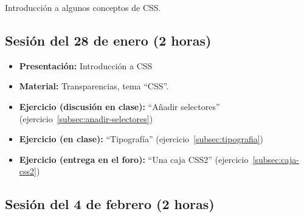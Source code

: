 \documentclass[a4paper,12pt]{report}
\begin{document}
Introducción a algunos conceptos de CSS.

\subsection{Sesión del 28 de enero (2 horas)}

\begin{itemize}
\item \textbf{Presentación:} Introducción a CSS
\item \textbf{Material:} Transparencias, tema ``CSS''.
\item \textbf{Ejercicio (discusión en clase):} ``Añadir selectores'' (ejercicio~\ref{subsec:anadir-selectores})
\item \textbf{Ejercicio (en clase):} ``Tipografía'' (ejercicio~\ref{subsec:tipografia})
\item \textbf{Ejercicio (entrega en el foro):} ``Una caja CSS2'' (ejercicio~\ref{subsec:caja-css2})
\end{itemize}

\subsection{Sesión del 4 de febrero (2 horas)}
\end{document}
